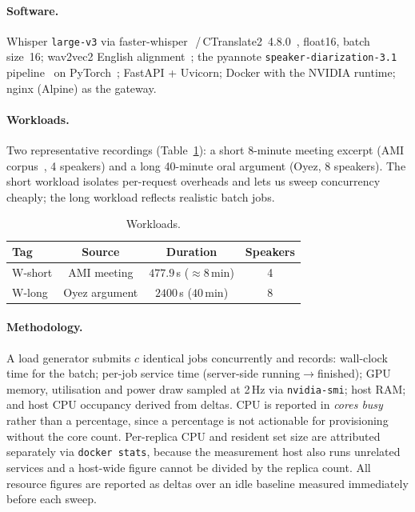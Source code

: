 \documentclass[10pt]{article}
\begin{document}
\paragraph{Software.} Whisper \texttt{large-v3} via
faster-whisper~\cite{fasterwhisper}\,/\,CTranslate2~4.8.0~\cite{ctranslate2},
float16, batch size~16; wav2vec2 English
alignment~\cite{baevski2020wav2vec2}; the pyannote
\texttt{speaker-diarization-3.1}
pipeline~\cite{bredin2023pyannote,plaquet2023powerset} on
PyTorch~\cite{paszke2019pytorch}; FastAPI + Uvicorn; Docker with the NVIDIA
runtime; nginx (Alpine) as the gateway.

\paragraph{Workloads.} Two representative recordings
(Table~\ref{tab:workloads}): a short 8-minute meeting excerpt (AMI
corpus~\cite{carletta2005ami}, 4 speakers) and a long 40-minute oral argument
(Oyez, 8 speakers). The short workload isolates per-request overheads and lets
us sweep concurrency cheaply; the long workload reflects realistic batch jobs.

\begin{table}[t]
\centering
\caption{Workloads.}
\label{tab:workloads}
\begin{tabular}{lccc}
\toprule
Tag & Source & Duration & Speakers \\
\midrule
W-short & AMI meeting & $477.9$\,s ($\approx 8$\,min) & 4 \\
W-long  & Oyez argument & $2400$\,s ($40$\,min) & 8 \\
\bottomrule
\end{tabular}
\end{table}

\paragraph{Methodology.} A load generator submits $c$ identical jobs
concurrently and records: wall-clock time for the batch; per-job service time
(server-side running$\rightarrow$finished); GPU memory, utilisation and power
draw sampled at 2\,Hz via \texttt{nvidia-smi}; host RAM; and host CPU occupancy
derived from  deltas. CPU is reported in \emph{cores busy}
rather than a percentage, since a percentage is not actionable for provisioning
without the core count. Per-replica CPU and resident set size are attributed
separately via \texttt{docker stats}, because the measurement host also runs
unrelated services and a host-wide figure cannot be divided by the replica
count. All resource figures are reported as deltas over an idle baseline
measured immediately before each sweep.
\end{document}
